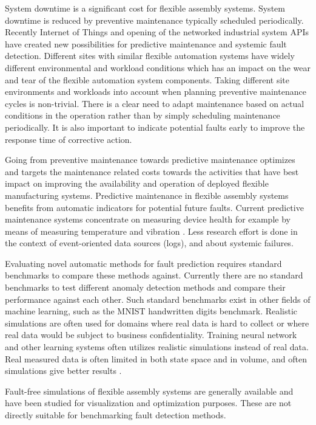 \documentclass[journal]{IEEEtran}
\begin{document}
System downtime is a significant cost for flexible assembly systems. System downtime is reduced by preventive maintenance typically scheduled periodically.
Recently Internet of Things and opening of the networked industrial system APIs have created new possibilities for predictive maintenance and systemic fault detection. Different sites with similar
flexible automation systems have widely different environmental and workload conditions which has an impact on the wear and tear of the flexible automation system components.
Taking different site environments and workloads into account when planning preventive maintenance cycles is non-trivial. There is a clear need to adapt maintenance based on actual
conditions in the operation rather than by simply scheduling maintenance periodically. It is also important to indicate potential faults early to improve the response time of corrective action.

Going from preventive maintenance towards predictive maintenance optimizes and targets the maintenance related costs towards the activities that have best impact
on improving the availability and operation of deployed flexible manufacturing systems.
Predictive maintenance in flexible assembly systems benefits from automatic indicators for potential future faults.
Current predictive maintenance systems concentrate on measuring device health for example by means of measuring temperature and vibration
\cite{TODO}. Less research effort is done in the context of event-oriented data sources (logs), and about systemic failures.

Evaluating novel automatic methods for fault prediction requires standard benchmarks to compare these methods against. Currently there are no standard benchmarks to test
different anomaly detection methods and compare their performance against each other. Such standard benchmarks exist in other fields of machine learning,
such as the MNIST handwritten digits benchmark\cite{lecun-mnisthandwrittendigit-2010}. Realistic simulations are often used\cite{jager2014assessing} for domains where
real data is hard to collect or where real data would be subject to business confidentiality. Training neural network and other learning systems often utilizes realistic
simulations instead of real data. Real measured data is often limited in both state space and in volume, and often simulations give better results \cite{duch2005artificial}.

Fault-free simulations of flexible assembly systems are generally available\cite{giulio} and have been studied for visualization and optimization purposes.
These are not directly suitable for benchmarking fault detection methods.
\end{document}
